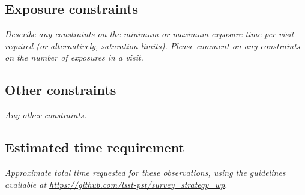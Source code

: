 \documentclass[11pt]{article}
\begin{document}
\subsection{Exposure constraints}
\begin{footnotesize}
{\it Describe any constraints on the minimum or maximum exposure time per visit required (or alternatively, saturation limits).
Please comment on any constraints on the number of exposures in a visit.}
\end{footnotesize}

\subsection{Other constraints}
\begin{footnotesize}
{\it Any other constraints.}
\end{footnotesize}

\subsection{Estimated time requirement}
\begin{footnotesize}
{\it Approximate total time requested for these observations, using the guidelines available at \url{https://github.com/lsst-pst/survey_strategy_wp}.}
\end{footnotesize}

\vspace{.3in}
\end{document}
